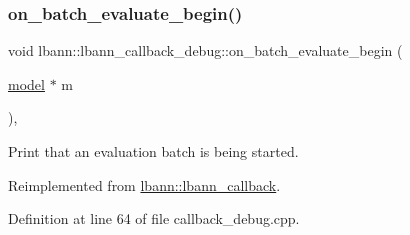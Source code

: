 \subsubsection{\texorpdfstring{on\+\_\+batch\+\_\+evaluate\+\_\+begin()}{on\_batch\_evaluate\_begin()}}
{\footnotesize\ttfamily void lbann\+::lbann\+\_\+callback\+\_\+debug\+::on\+\_\+batch\+\_\+evaluate\+\_\+begin (\begin{DoxyParamCaption}\item[{\hyperlink{classlbann_1_1model}{model} $\ast$}]{m }\end{DoxyParamCaption})\hspace{0.3cm}{\ttfamily [override]}, {\ttfamily [virtual]}}

Print that an evaluation batch is being started. 

Reimplemented from \hyperlink{classlbann_1_1lbann__callback_a3462e54126adbd0082c22c98d8de5468}{lbann\+::lbann\+\_\+callback}.



Definition at line 64 of file callback\+\_\+debug.\+cpp.


